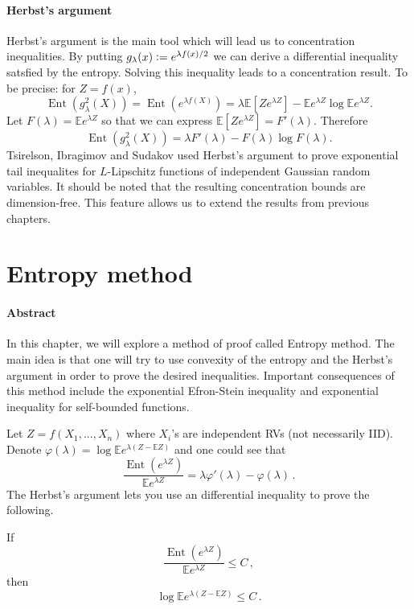 \documentclass{amsproc}
\newcommand{\defeq}{\vcentcolon=} %
\newcommand{\E}{\mathbb{E}} %
\DeclareMathOperator{\Ent}{Ent} %
\begin{document}
\paragraph{\textbf{Herbst's argument}}
\label{rmk:herbst}
	Herbst's argument is the main tool which will lead us to concentration inequalities.
	By putting $g_\lambda(x)\defeq e^{\lambda f(x)/2}$ we can derive a differential inequality satsfied by the entropy.
	Solving this inequality leads to a concentration result. To be precise: for $Z = f(x)$,
	$$ \Ent (g_\lambda^2(X)) = \Ent (e^{\lambda f(X)}) = \lambda\E[Ze^{\lambda Z}] - \E e^{\lambda Z}\log\E e^{\lambda Z}.$$
	Let $F(\lambda) = \E e^{\lambda Z}$ so that we can express $\E[Ze^{
	\lambda Z}] = F'(\lambda)$. Therefore
	$$\Ent(g^2_\lambda (X)) = \lambda F'(\lambda) - F(\lambda)\log F(\lambda).$$
	Tsirelson, Ibragimov and Sudakov used Herbst's argument to prove exponential tail inequalites for $L$-Lipschitz functions of independent Gaussian random variables.
	It should be noted that the resulting concentration bounds are dimension-free. This feature allows us to extend the results from previous chapters.

\section{ Entropy method}
\label{sec:EntropyMethod}
\paragraph{\textbf{Abstract}}
In this chapter, we will explore a method of proof called Entropy method. The
main idea is that one will try to use convexity of the entropy and the Herbst's
argument in order to prove the desired inequalities. Important consequences of
this method include the exponential Efron-Stein inequality and exponential
inequality for self-bounded functions.

Let $Z = f(X_1,...,X_n)$ where $X_i$'s are independent RVs (not necessarily
IID). Denote $\varphi(\lambda) = \log \E e^{\lambda(Z - \E Z)}$ and one could
see that 
\begin{equation*}
  \frac{ \Ent (e^{\lambda Z})}{ \E e^{\lambda Z}} = \lambda \varphi'(\lambda) -
  \varphi(\lambda) \,.
\end{equation*}
The Herbst's argument lets you use an differential inequality to prove the
following.

If 
\begin{equation*}
  \frac{ \Ent (e^{\lambda Z})}{ \E e^{\lambda Z}} \leq C \,,
\end{equation*}
then 
\begin{equation} \label{HerbstArg}
  \log \E e^{\lambda(Z- \E Z)} \leq C \,.
\end{equation}
\end{document}

